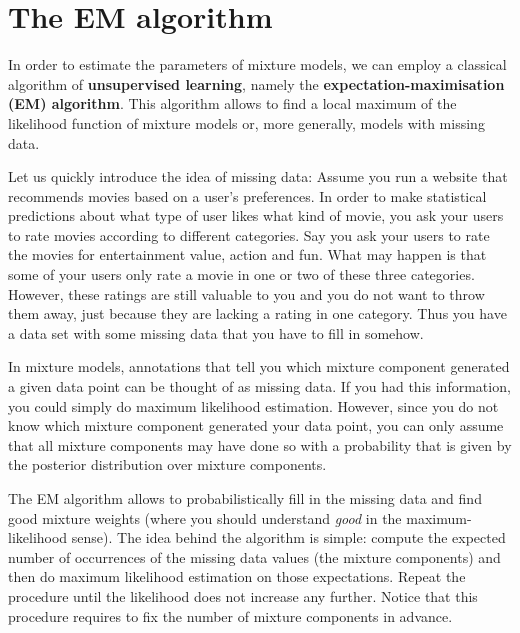 \section{The EM algorithm}

In order to estimate the parameters of mixture models, we can employ a classical algorithm of 
\textbf{unsupervised learning}, namely the \textbf{expectation-maximisation (EM) algorithm}. This
algorithm allows to find a local maximum of the likelihood function of mixture models or, more
generally, models with missing data. 

Let us quickly introduce the idea of missing data: Assume you run a website that recommends movies
based on a user's preferences. In order to make statistical predictions about what type of user
likes what kind of movie, you ask your users to rate movies according to different categories.
Say you ask your users to rate the movies for entertainment value, action and fun. What may happen is
that some of your users only rate a movie in one or two of these three categories. However, these
ratings are still valuable to you and you do not want to throw them away, just because they are lacking
a rating in one category. Thus you have a data set with some missing data that you have to fill in somehow.

\medskip 
In mixture models, annotations that tell you which mixture component
generated a given data point can be thought of as missing data. If you had this information, you could simply do maximum likelihood estimation.
However, since you do not know which mixture component generated your data point, you can only
assume that all mixture components may have done so with a probability that is given by the posterior distribution
over mixture components.

The EM algorithm allows to probabilistically fill in the missing data and find good mixture weights
(where you should understand \textit{good} in the maximum-likelihood sense). The idea behind the
algorithm is simple: compute the expected number of occurrences of the missing data values (the mixture 
components) and then do maximum likelihood estimation on those expectations. Repeat the procedure 
until the likelihood does not increase any further. Notice that this procedure requires to
fix the number of mixture components in advance.

